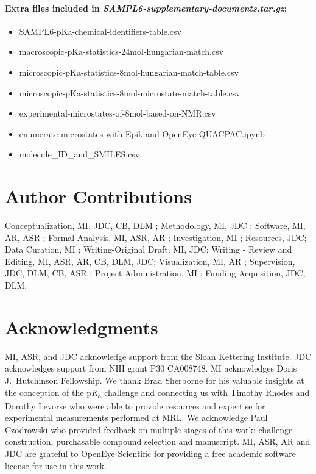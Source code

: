 \documentclass[9pt,lineno,final]{elife}
\newcommand{\pKa}{p\textit{K}\textsubscript{a}}
\begin{document}
\paragraph{Extra files included in \textit{SAMPL6-supplementary-documents.tar.gz}:}  
\begin{itemize}
\item SAMPL6-pKa-chemical-identifiers-table.csv 
\item macroscopic-pKa-statistics-24mol-hungarian-match.csv
\item microscopic-pKa-statistics-8mol-hungarian-match-table.csv
\item microscopic-pKa-statistics-8mol-microstate-match-table.csv
\item experimental-microstates-of-8mol-based-on-NMR.csv
\item enumerate-microstates-with-Epik-and-OpenEye-QUACPAC.ipynb
\item molecule\_ID\_and\_SMILES.csv
\end{itemize}


\section{Author Contributions}

Conceptualization, MI, JDC, CB, DLM ; Methodology, MI, JDC ; Software, MI, AR, ASR ; Formal Analysis, MI, ASR, AR ; Investigation, MI ; Resources, JDC;  Data Curation, MI ; Writing-Original Draft, MI, JDC; Writing - Review and Editing, MI, ASR, AR, CB, DLM, JDC; Visualization, MI, AR ; Supervision, JDC, DLM, CB, ASR ; Project Administration, MI ; Funding Acquisition, JDC, DLM.


\section{Acknowledgments}

MI, ASR, and JDC acknowledge support from the Sloan Kettering Institute.
JDC acknowledges support from NIH grant P30 CA008748. 
MI acknowledges Doris J.\ Hutchinson Fellowship. 
We thank Brad Sherborne for his valuable insights at the conception of the \pKa{} challenge and connecting us with Timothy Rhodes and Dorothy Levorse who were able to provide resources and expertise for experimental measurements performed at MRL. 
We acknowledge Paul Czodrowski who provided feedback on multiple stages of this work: challenge construction, purchasable compound selection and manuscript. 
MI, ASR, AR and JDC are grateful to OpenEye Scientific for providing a free academic software license for use in this work.
\end{document}
